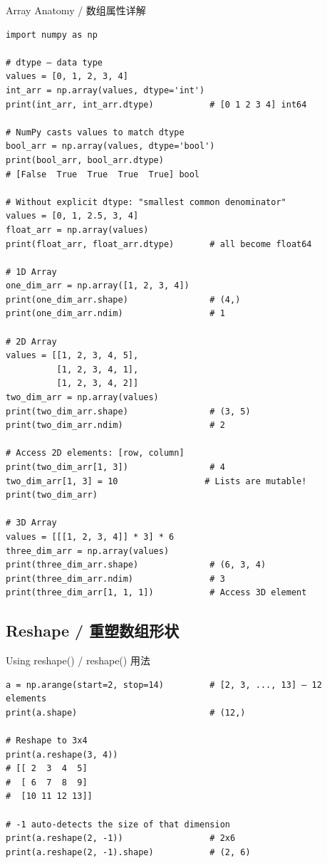 \documentclass[11pt,a4paper]{report}
\begin{document}
\begin{examplebox}{Array Anatomy / 数组属性详解}
\begin{lstlisting}
import numpy as np

# dtype — data type
values = [0, 1, 2, 3, 4]
int_arr = np.array(values, dtype='int')
print(int_arr, int_arr.dtype)           # [0 1 2 3 4] int64

# NumPy casts values to match dtype
bool_arr = np.array(values, dtype='bool')
print(bool_arr, bool_arr.dtype)
# [False  True  True  True  True] bool

# Without explicit dtype: "smallest common denominator"
values = [0, 1, 2.5, 3, 4]
float_arr = np.array(values)
print(float_arr, float_arr.dtype)       # all become float64

# 1D Array
one_dim_arr = np.array([1, 2, 3, 4])
print(one_dim_arr.shape)                # (4,)
print(one_dim_arr.ndim)                 # 1

# 2D Array
values = [[1, 2, 3, 4, 5],
          [1, 2, 3, 4, 1],
          [1, 2, 3, 4, 2]]
two_dim_arr = np.array(values)
print(two_dim_arr.shape)                # (3, 5)
print(two_dim_arr.ndim)                 # 2

# Access 2D elements: [row, column]
print(two_dim_arr[1, 3])                # 4
two_dim_arr[1, 3] = 10                 # Lists are mutable!
print(two_dim_arr)

# 3D Array
values = [[[1, 2, 3, 4]] * 3] * 6
three_dim_arr = np.array(values)
print(three_dim_arr.shape)              # (6, 3, 4)
print(three_dim_arr.ndim)               # 3
print(three_dim_arr[1, 1, 1])           # Access 3D element
\end{lstlisting}
\end{examplebox}

\subsection{Reshape / 重塑数组形状}

\begin{examplebox}{Using reshape() / reshape() 用法}
\begin{lstlisting}
a = np.arange(start=2, stop=14)         # [2, 3, ..., 13] — 12 elements
print(a.shape)                          # (12,)

# Reshape to 3x4
print(a.reshape(3, 4))
# [[ 2  3  4  5]
#  [ 6  7  8  9]
#  [10 11 12 13]]

# -1 auto-detects the size of that dimension
print(a.reshape(2, -1))                 # 2x6
print(a.reshape(2, -1).shape)           # (2, 6)
\end{lstlisting}
\end{examplebox}
\end{document}
